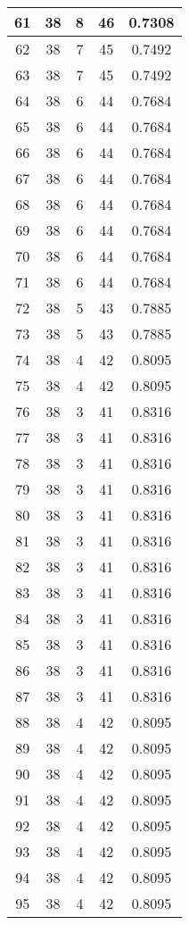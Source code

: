 \documentclass[letterpaper, 12pt]{article}
\begin{document}
\begin{longtable}{|c|c|c|c|c|}
\hline
61 & 38 & 8 & 46 & 0.7308 \\
\hline
62 & 38 & 7 & 45 & 0.7492 \\
\hline
63 & 38 & 7 & 45 & 0.7492 \\
\hline
64 & 38 & 6 & 44 & 0.7684 \\
\hline
65 & 38 & 6 & 44 & 0.7684 \\
\hline
66 & 38 & 6 & 44 & 0.7684 \\
\hline
67 & 38 & 6 & 44 & 0.7684 \\
\hline
68 & 38 & 6 & 44 & 0.7684 \\
\hline
69 & 38 & 6 & 44 & 0.7684 \\
\hline
70 & 38 & 6 & 44 & 0.7684 \\
\hline
71 & 38 & 6 & 44 & 0.7684 \\
\hline
72 & 38 & 5 & 43 & 0.7885 \\
\hline
73 & 38 & 5 & 43 & 0.7885 \\
\hline
74 & 38 & 4 & 42 & 0.8095 \\
\hline
75 & 38 & 4 & 42 & 0.8095 \\
\hline
76 & 38 & 3 & 41 & 0.8316 \\
\hline
77 & 38 & 3 & 41 & 0.8316 \\
\hline
78 & 38 & 3 & 41 & 0.8316 \\
\hline
79 & 38 & 3 & 41 & 0.8316 \\
\hline
80 & 38 & 3 & 41 & 0.8316 \\
\hline
81 & 38 & 3 & 41 & 0.8316 \\
\hline
82 & 38 & 3 & 41 & 0.8316 \\
\hline
83 & 38 & 3 & 41 & 0.8316 \\
\hline
84 & 38 & 3 & 41 & 0.8316 \\
\hline
85 & 38 & 3 & 41 & 0.8316 \\
\hline
86 & 38 & 3 & 41 & 0.8316 \\
\hline
87 & 38 & 3 & 41 & 0.8316 \\
\hline
88 & 38 & 4 & 42 & 0.8095 \\
\hline
89 & 38 & 4 & 42 & 0.8095 \\
\hline
90 & 38 & 4 & 42 & 0.8095 \\
\hline
91 & 38 & 4 & 42 & 0.8095 \\
\hline
92 & 38 & 4 & 42 & 0.8095 \\
\hline
93 & 38 & 4 & 42 & 0.8095 \\
\hline
94 & 38 & 4 & 42 & 0.8095 \\
\hline
95 & 38 & 4 & 42 & 0.8095 \\

\end{longtable}
\end{document}
